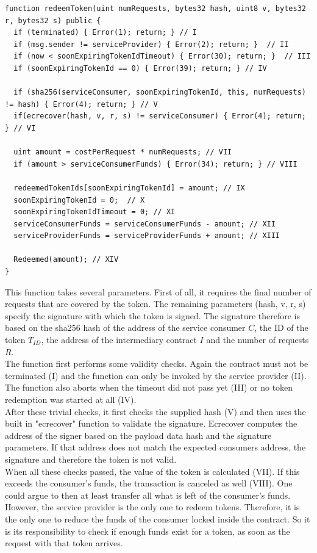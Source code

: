 \documentclass[a4paper,12pt]{scrartcl}
\begin{document}
\begin{lstlisting}[caption={Finalize token redemption.},label=lst:tokenredemption2]
function redeemToken(uint numRequests, bytes32 hash, uint8 v, bytes32 r, bytes32 s) public {
  if (terminated) { Error(1); return; } // I
  if (msg.sender != serviceProvider) { Error(2); return; }  // II
  if (now < soonExpiringTokenIdTimeout) { Error(30); return; }  // III
  if (soonExpiringTokenId == 0) { Error(39); return; } // IV

  if (sha256(serviceConsumer, soonExpiringTokenId, this, numRequests) != hash) { Error(4); return; } // V
  if(ecrecover(hash, v, r, s) != serviceConsumer) { Error(4); return; } // VI

  uint amount = costPerRequest * numRequests; // VII
  if (amount > serviceConsumerFunds) { Error(34); return; } // VIII

  redeemedTokenIds[soonExpiringTokenId] = amount; // IX
  soonExpiringTokenId = 0;  // X
  soonExpiringTokenIdTimeout = 0; // XI
  serviceConsumerFunds = serviceConsumerFunds - amount; // XII
  serviceProviderFunds = serviceProviderFunds + amount; // XIII

  Redeemed(amount); // XIV
}
\end{lstlisting}

This function takes several parameters. First of all, it requires the final number of requests that are covered by the token. The remaining parameters (hash, v, r, s) specify the signature with which the token is signed. The signature therefore is based on the sha256 hash of the address of the service consumer $C$, the ID of the token $T_{ID}$, the address of the intermediary contract $I$ and the number of requests $R$.\\
The function first performs some validity checks. Again the contract must not be terminated (I) and the function can only be invoked by the service provider (II). The function also aborts when the timeout did not pass yet (III) or no token redemption was started at all (IV).\\

After these trivial checks, it first checks the supplied hash (V) and then uses the built in "ecrecover" function to validate the signature. Ecrecover computes the address of the signer based on the payload data hash and the signature parameters. If that address does not match the expected consumers address, the signature and therefore the token is not valid.\\

When all these checks passed, the value of the token is calculated (VII). If this exceeds the consumer's funds, the transaction is canceled as well (VIII). One could argue to then at least transfer all what is left of the consumer's funds. However, the service provider is the only one to redeem tokens. Therefore, it is the only one to reduce the funds of the consumer locked inside the contract. So it is its responsibility to check if enough funds exist for a token, as soon as the request with that token arrives.\\
\end{document}
